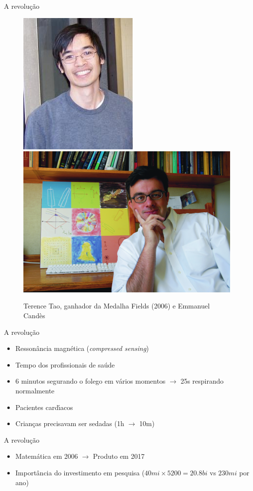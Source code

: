 \documentclass{beamer}
\begin{document}
\begin{frame}{A revolu\c{c}\~ao}
    \begin{figure}
        \centering
        \includegraphics[height=0.4\textwidth]{figs/tao.jpg}
        \hfill
        \includegraphics[height=0.4\textwidth]{figs/emmanuel-candes.jpg}
        \caption{Terence Tao, ganhador da Medalha Fields (2006) e Emmanuel Candès}
    \end{figure}
\end{frame}

\begin{frame}{A revolu\c{c}\~ao}
    \begin{itemize}
        \item Resson\^ancia magn\'etica (\textit{compressed sensing})
        \item Tempo dos profissionais de sa\'ude
        \item 6 minutos segurando o folego em v\'arios momentos $\rightarrow$ 25s respirando normalmente
        \item Pacientes card\'{\i}acos
        \item Crian\c{c}as precisavam ser sedadas (1h $\rightarrow$ 10m)
    \end{itemize}
\end{frame}

\begin{frame}{A revolu\c{c}\~ao}
    \begin{itemize}
        \item Matem\'atica em 2006 $\rightarrow$ Produto em 2017
        \item Import\^ancia do investimento em pesquisa ($40mi \times 5200 = 20.8bi$ vs $230mi$ por ano)
    \end{itemize}
\end{frame}
\end{document}
